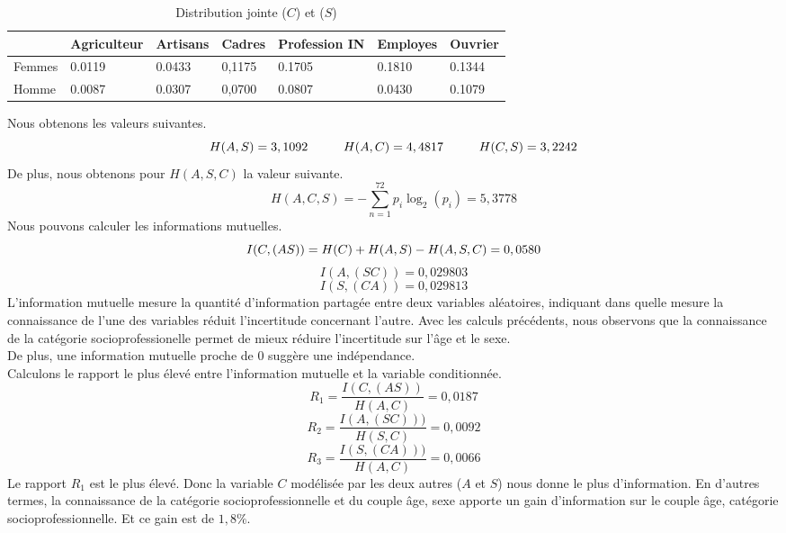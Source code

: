 \documentclass{article}
\begin{document}
\begin{table}[H]
  \centering
  \caption{Distribution jointe ($C$) et ($S$)}
  \begin{tabular}{|l|l|l|l|l|l|l|}
  \hline
         & Agriculteur & Artisans & Cadres & Profession IN & Employes & Ouvrier \\ \hline
    Femmes & 0.0119      & 0.0433   & 0,1175 & 0.1705        & 0.1810   & 0.1344  \\ \hline
    Homme  & 0.0087      & 0.0307   & 0,0700 & 0.0807        & 0.0430   & 0.1079  \\ \hline
    \end{tabular}
\end{table}
Nous obtenons les valeurs suivantes.
\[
H(A,S)=3,1092 \hspace{1 cm} H(A,C)= 4,4817 \hspace{1cm} H(C,S)=3,2242
\]
De plus, nous obtenons pour $H(A,S,C)$ la valeur suivante.
\[
  H(A,C,S) = -\sum_{n = 1}^{72}p_i\log_2(p_i)=5,3778
\]
Nous pouvons calculer les informations mutuelles.
\[
I(C,(AS))=H(C)+H(A,S)-H(A,S,C) = 0,0580 \\
\]
\[
I(A,(SC))= 0,029803
\]
\[
I(S,(CA))=0,029813
\]
L’information mutuelle mesure la quantité d’information partagée entre deux variables aléatoires, indiquant dans quelle mesure la connaissance de l’une des variables réduit l’incertitude concernant l’autre. 
Avec les calculs précédents, nous observons que la connaissance de la catégorie socioprofessionelle permet de mieux réduire l'incertitude sur l'âge et le sexe.\\
De plus, une information mutuelle proche de 0 suggère une indépendance.\\
Calculons le rapport le plus élevé entre l'information mutuelle et la variable conditionnée.
\[
R_1 = \frac{I(C,(AS))}{H(A,C)}=0,0187
\]
\[
R_2 = \frac{I(A,(SC)))}{H(S,C)}=0,0092
\]
\[
R_3 = \frac{I(S,(CA)))}{H(A,C)}=0,0066
\]
Le rapport $R_1$ est le plus élevé. Donc la variable $C$ modélisée par les deux autres ($A$ et $S$) nous donne le plus d'information.
En d'autres termes, la connaissance de la catégorie socioprofessionnelle et du couple âge, sexe apporte un gain d'information sur le couple âge, catégorie socioprofessionnelle. Et ce gain est de $1,8\%$.
\end{document}
